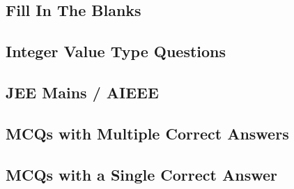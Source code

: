 \subsection*{Fill In The Blanks}
\begin{enumerate}[label=\thesubsection.\arabic*,ref=\thesubsection.\theenumi]




\end{enumerate}
\subsection*{Integer Value Type Questions}
\begin{enumerate}[label=\thesubsection.\arabic*,ref=\thesubsection.\theenumi]




\end{enumerate}
\subsection*{JEE Mains / AIEEE}
\begin{enumerate}[label=\thesubsection.\arabic*,ref=\thesubsection.\theenumi]





\end{enumerate}
\subsection*{MCQs with Multiple Correct Answers}
\begin{enumerate}[label=\thesubsection.\arabic*,ref=\thesubsection.\theenumi]





\end{enumerate}
\subsection*{MCQs with a Single Correct Answer}
\begin{enumerate}[label=\thesubsection.\arabic*,ref=\thesubsection.\theenumi]






\end{enumerate}
